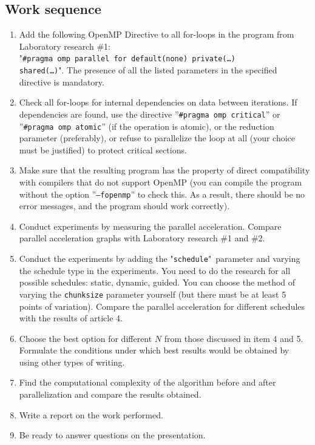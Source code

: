 { %
	\subsection{Work sequence}
	\begin{enumerate}
		\item Add the following OpenMP Directive to all for-loops in the program from Laboratory research \#1: \\	
"\texttt{{\small \#pragma omp parallel for default(none) private(…)\\ shared(…)}}"{}. The presence of all the listed parameters in the specified directive is mandatory.
		\item Check all for-loops for internal dependencies on data between iterations. If dependencies are found, use the directive ''{\small \texttt{\#pragma omp critical}}'' or ''{\small \texttt{\#pragma omp atomic}}'' (if the operation is atomic), or the reduction parameter (preferably), or refuse to parallelize the loop at all (your choice must be justified) to protect critical sections.
		\item Make sure that the resulting program has the property of direct compatibility with compilers that do not support OpenMP (you can compile the program without the option ''\texttt{–fopenmp}'' to check this. As a result, there should be no error messages, and the program should work correctly).
		\item Conduct experiments by measuring the parallel acceleration. Compare parallel acceleration graphs with Laboratory research \#1 and \#2.
		\item Conduct the experiments by adding the "\texttt{schedule}"\ parameter and varying the schedule type in the experiments. You need to do the research for all possible schedules: static, dynamic, guided. You can choose the method of varying the \texttt{chunk\textunderscore size} parameter yourself (but there must be at least 5 points of variation). Compare the parallel acceleration for different schedules with the results of article 4.
		\item Choose the best option for different $N$ from those discussed in item 4 and 5. Formulate the conditions under which best results would be obtained by using other types of writing.
		\item Find the computational complexity of the algorithm before and after parallelization and compare the results obtained.
		\item Write a report on the work performed.
		\item Be ready to answer questions on the presentation.

\end{enumerate}}
